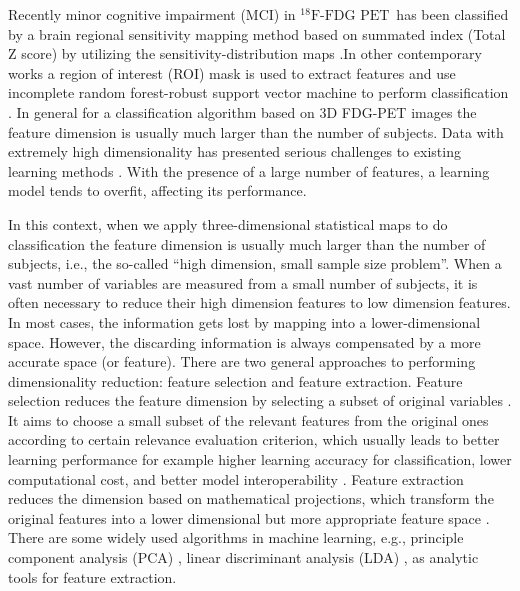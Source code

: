 \documentclass[authoryear,preprint,revi	ew,12pt]{elsarticle}
\newcommand{\FDGPET}   {$ ^{18}\textrm{F-FDG PET} $}
\begin{document}
Recently minor cognitive impairment (MCI) in \FDGPET ~has been classified by a brain regional sensitivity mapping method based on summated index (Total Z score) by utilizing the sensitivity-distribution maps \citep{kakimoto2011new}.In other contemporary works a region of interest (ROI) mask is used to extract features and use incomplete random forest-robust support vector machine to perform classification \citep{lu2017early}. In general for a classification algorithm based on 3D FDG-PET images the feature dimension is usually much larger than the number of subjects. Data with extremely high dimensionality has presented serious challenges to existing learning methods \citep{liu2007computational, friedman2001elements}. With the presence of a large number of features, a learning model tends to overfit, affecting its performance.

In this context, when we apply three-dimensional statistical maps to do classification the feature dimension is usually much larger than the number of subjects, i.e., the so-called “high dimension, small sample size problem”. When a vast number of variables are measured from a small number of subjects, it is often necessary to reduce their high dimension features to low dimension features. In most cases, the information gets lost by mapping into a lower-dimensional space. However, the discarding information is always compensated by a more accurate space (or feature). There are two general approaches to performing dimensionality reduction: feature selection and feature extraction. Feature selection reduces the feature dimension by selecting a subset of original variables \citep{jain1997feature}. It aims to choose a small subset of the relevant features from the original ones according to certain relevance evaluation criterion, which usually leads to better learning performance for example higher learning accuracy for classification, lower computational cost, and better model interoperability \citep{tang2014feature}. Feature extraction reduces the dimension based on mathematical projections, which transform the original features into a lower dimensional but more appropriate feature space \citep{guyon2008feature}. There are some widely used algorithms in machine learning, e.g., principle component analysis (PCA) \citep{jolliffe2002principal}, linear discriminant analysis (LDA) \citep{mika1999fisher}, as analytic tools for feature extraction.
\end{document}
